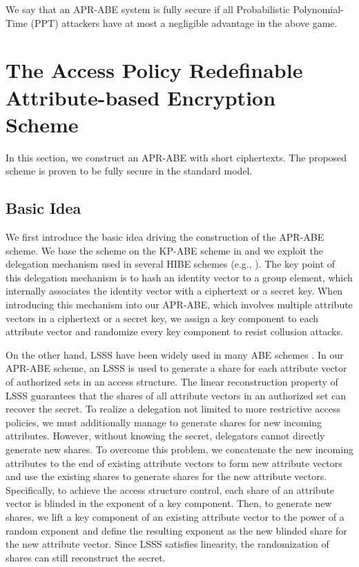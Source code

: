 \documentclass[twocolumn]{svjour3}          \smartqed  \usepackage{graphicx}
\begin{document}
\begin{definition}\label{KP-Security}
We say that an APR-ABE system is fully secure if all Probabilistic Polynomial-Time (PPT) attackers  have at most a negligible advantage in the
above game.
\end{definition}

\section{The Access Policy Redefinable Attribute-based Encryption Scheme}
\label{scheme}
In this section, we construct an APR-ABE with short ciphertexts. The proposed scheme is proven to be fully secure in the standard model.

\subsection{Basic Idea}

We first introduce the basic idea driving
the construction of the APR-ABE scheme.
We base the scheme on the KP-ABE scheme in \cite{LOS+10} and we exploit the
delegation mechanism used in several HIBE schemes (e.g., \cite{BBG05,LW10}).
The key point of this delegation mechanism is
to hash an identity vector to a group
element, which internally associates the identity vector with a ciphertext or a secret key. When introducing this mechanism into our APR-ABE, which involves multiple attribute vectors in a ciphertext or a secret key, we assign a key component to each attribute vector and randomize every key component  to resist collusion attacks.

On the other hand, LSSS have been widely used
in many ABE schemes \cite{ALP11,LOS+10,LW11,Wat11}. In our APR-ABE scheme,
an LSSS is used to generate
a share for each attribute vector of authorized sets in an access structure. The linear reconstruction property of LSSS guarantees that the shares of all attribute vectors in an authorized set can recover the secret. To realize a delegation not limited to
 more restrictive access policies, we must additionally manage to generate shares for new incoming attributes. However, without knowing the secret, delegators cannot directly generate new shares.
To overcome this problem, we concatenate the new incoming attributes to the end of existing attribute vectors to form new attribute vectors and use the existing shares to generate shares for the new attribute vectors. Specifically, to achieve the access structure control, each share of an attribute vector is blinded in the exponent of a key component. Then, to generate new shares, we lift a key component of an existing attribute vector to the power of a random exponent and define the resulting exponent as the new blinded share for the new attribute vector. Since LSSS satisfies linearity, the randomization of shares can still reconstruct the secret.
\end{document}
